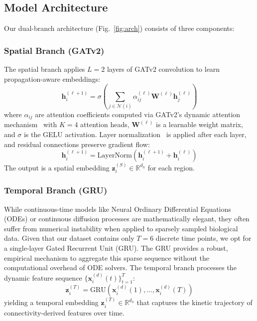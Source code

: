 \documentclass[conference]{IEEEtran}
\begin{document}
\subsection{Model Architecture}
Our dual-branch architecture (Fig.~\ref{fig:arch}) consists of three components:

\subsubsection{Spatial Branch (GATv2)}
The spatial branch applies $L = 2$ layers of GATv2 convolution to learn propagation-aware embeddings:
\begin{equation}
    \mathbf{h}_i^{(\ell+1)} = \sigma\left(\sum_{j \in \mathcal{N}(i)} \alpha_{ij}^{(\ell)} \mathbf{W}^{(\ell)} \mathbf{h}_j^{(\ell)}\right)
\end{equation}
where $\alpha_{ij}$ are attention coefficients computed via GATv2's dynamic attention mechanism~\cite{brody2022how} with $K = 4$ attention heads, $\mathbf{W}^{(\ell)}$ is a learnable weight matrix, and $\sigma$ is the GELU activation. Layer normalization~\cite{ba2016layer} is applied after each layer, and residual connections preserve gradient flow:
\begin{equation}
    \mathbf{h}_i^{(\ell+1)} = \text{LayerNorm}\left(\mathbf{h}_i^{(\ell+1)} + \mathbf{h}_i^{(\ell)}\right)
\end{equation}
The output is a spatial embedding $\mathbf{z}_i^{(S)} \in \mathbb{R}^{d_h}$ for each region.

\subsubsection{Temporal Branch (GRU)}
While continuous-time models like Neural Ordinary Differential Equations (ODEs) or continuous diffusion processes are mathematically elegant, they often suffer from numerical instability when applied to sparsely sampled biological data. Given that our dataset contains only $T=6$ discrete time points, we opt for a single-layer Gated Recurrent Unit (GRU). The GRU provides a robust, empirical mechanism to aggregate this sparse sequence without the computational overhead of ODE solvers. The temporal branch processes the dynamic feature sequence $\{\mathbf{x}_i^{(d)}(t)\}_{t=1}^{T}$:
\begin{equation}
    \mathbf{z}_i^{(T)} = \text{GRU}\left(\mathbf{x}_i^{(d)}(1), \ldots, \mathbf{x}_i^{(d)}(T)\right)
\end{equation}
yielding a temporal embedding $\mathbf{z}_i^{(T)} \in \mathbb{R}^{d_h}$ that captures the kinetic trajectory of connectivity-derived features over time.
\end{document}
